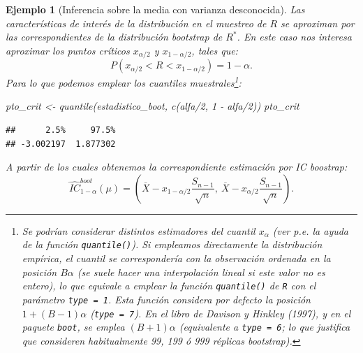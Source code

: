 \documentclass[
]{book}
\newenvironment{Shaded}{\begin{snugshade}}{\end{snugshade}}
\newcommand{\DecValTok}[1]{\textcolor[rgb]{0.00,0.00,0.81}{#1}}
\newcommand{\FunctionTok}[1]{\textcolor[rgb]{0.00,0.00,0.00}{#1}}
\newcommand{\NormalTok}[1]{#1}
\newcommand{\OtherTok}[1]{\textcolor[rgb]{0.56,0.35,0.01}{#1}}
\newcommand{\SpecialCharTok}[1]{\textcolor[rgb]{0.00,0.00,0.00}{#1}}
\theoremstyle{break}
\newtheorem{example}{Ejemplo}[chapter]
\theoremstyle{nonumberplain}
\begin{document}
\begin{example}[Inferencia sobre la media con varianza desconocida]
Las características de interés de la distribución en el muestreo de \(R\)
se aproximan por las correspondientes de la distribución bootstrap de \(R^{\ast}\).
En este caso nos interesa aproximar los puntos críticos \(x_{\alpha /2}\) y
\(x_{1-\alpha /2}\), tales que:
\[P\left( x_{\alpha /2} < R < x_{1-\alpha /2} \right) = 1-\alpha.\]
Para lo que podemos emplear los cuantiles muestrales\footnote{
  Se podrían considerar distintos estimadores del cuantil \(x_{\alpha}\)
  (ver p.e. la ayuda de la función \texttt{quantile()}).
  Si empleamos directamente la distribución empírica, el cuantil se
  correspondería con la observación ordenada en la posición \(B \alpha\)
  (se suele hacer una interpolación lineal si este valor no es entero),
  lo que equivale a emplear la función \texttt{quantile()} de \texttt{R} con el parámetro
  \texttt{type\ =\ 1}. Esta función considera por defecto la posición
  \(1 + (B - 1) \alpha\) (\texttt{type\ =\ 7}).
  En el libro de Davison y Hinkley (1997), y en el paquete \texttt{boot}, se emplea \((B + 1) \alpha\) (equivalente a \texttt{type\ =\ 6}; lo que justifica que
  consideren habitualmente 99, 199 ó 999 réplicas bootstrap).}:

\begin{Shaded}
\begin{Highlighting}[]
\NormalTok{pto\_crit }\OtherTok{\textless{}{-}} \FunctionTok{quantile}\NormalTok{(estadistico\_boot, }\FunctionTok{c}\NormalTok{(alfa}\SpecialCharTok{/}\DecValTok{2}\NormalTok{, }\DecValTok{1} \SpecialCharTok{{-}}\NormalTok{ alfa}\SpecialCharTok{/}\DecValTok{2}\NormalTok{))}
\NormalTok{pto\_crit}
\end{Highlighting}
\end{Shaded}

\begin{verbatim}
##      2.5%     97.5% 
## -3.002197  1.877302
\end{verbatim}

A partir de los cuales obtenemos la correspondiente estimación por IC boostrap:
\[\hat{IC}^{boot}_{1-\alpha}\left(  \mu\right)  = 
\left(  \overline{X}-x_{1-\alpha/2}\dfrac{S_{n-1}}{\sqrt{n}},\ \overline{X} 
- x_{\alpha/2}\dfrac{S_{n-1}}{\sqrt{n}} \right).\]


\end{example}
\end{document}
